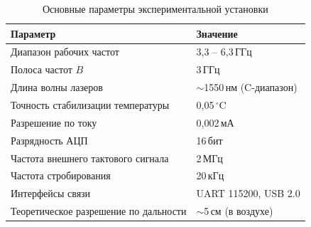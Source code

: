 \begin{table}[H]
\centering
\caption{Основные параметры экспериментальной установки}
\label{tab:system-params}
\begin{tabular}{l l}
\toprule
Параметр & Значение \\
\midrule
Диапазон рабочих частот & 3{,}3 -- 6{,}3\,ГГц \\
Полоса частот $B$ & 3\,ГГц \\
Длина волны лазеров & $\sim$1550\,нм (C-диапазон) \\
Точность стабилизации температуры & 0{,}05\,$^\circ$C \\
Разрешение по току & 0{,}002\,мА \\
Разрядность АЦП & 16\,бит \\
Частота внешнего тактового сигнала & 2\,МГц \\
Частота стробирования & 20\,кГц \\
Интерфейсы связи & UART 115200, USB 2.0 \\
Теоретическое разрешение по дальности & $\sim$5\,см (в воздухе) \\
\bottomrule
\end{tabular}
\end{table}
